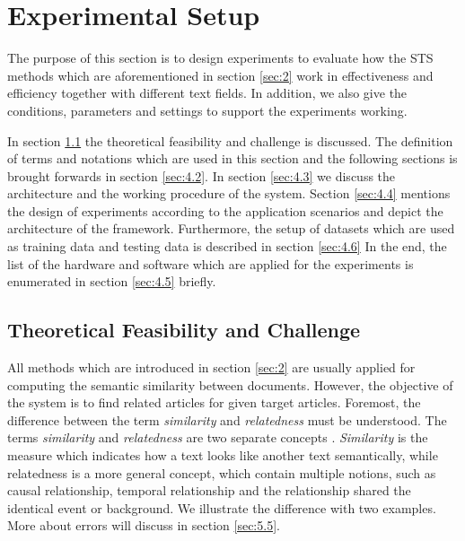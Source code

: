 \section{Experimental Setup}
\label{sec:4}

The purpose of this section is to design experiments to evaluate how the STS methods which are aforementioned in section \ref{sec:2} work in effectiveness and efficiency together with different text fields. In addition, we also give the conditions, parameters and settings to support the experiments working. 

In section \ref{sec:4.1} the theoretical feasibility and challenge is discussed. The definition of terms and notations which are used in this section and the following sections is brought forwards in section \ref{sec:4.2}. In section \ref{sec:4.3} we discuss the architecture and the working procedure of the system. Section \ref{sec:4.4} mentions the design of experiments according to the application scenarios and depict the architecture of the framework. Furthermore, the setup of datasets which are used as training data and testing data is described in section \ref{sec:4.6} In the end, the list of the hardware and software which are applied for the experiments is enumerated in section \ref{sec:4.5} briefly.

\subsection{Theoretical Feasibility and Challenge}
\label{sec:4.1}

All methods which are introduced in section \ref{sec:2} are usually applied for computing the semantic similarity between documents. However, the objective of the system is to find related articles for given target articles. Foremost, the difference between the term \textit{similarity} and \textit{relatedness} must be understood. The terms \textit{similarity} and \textit{relatedness} are two separate concepts \cite{pedersen2007measures}. \textit{Similarity} is the measure which indicates how a text looks like another text semantically, while relatedness is a more general concept, which contain multiple notions, such as causal relationship, temporal relationship and the relationship shared the identical event or background. We illustrate the difference with two examples. More about errors will discuss in section \ref{sec:5.5}. 

